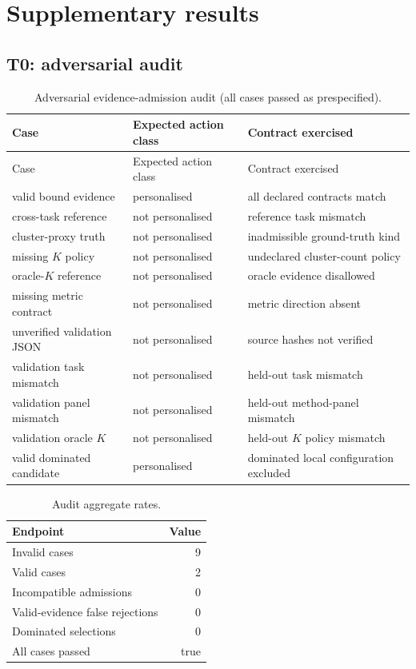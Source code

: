 \documentclass[11pt]{article}
\begin{document}
\section{Supplementary results}

\subsection{T0: adversarial audit}

\begin{longtable}{@{}p{}p{}p{}@{}}
\caption{Adversarial evidence-admission audit (all cases passed as
prespecified).
\label{tab:audit}}\\
\toprule
Case & Expected action class & Contract exercised \\
\midrule
\endfirsthead
\toprule
Case & Expected action class & Contract exercised \\
\midrule
\endhead
valid bound evidence & personalised & all declared contracts match \\
cross-task reference & not personalised & reference task mismatch \\
cluster-proxy truth & not personalised & inadmissible ground-truth kind \\
missing \(K\) policy & not personalised & undeclared cluster-count policy \\
oracle-\(K\) reference & not personalised & oracle evidence disallowed \\
missing metric contract & not personalised & metric direction absent \\
unverified validation JSON & not personalised & source hashes not verified \\
validation task mismatch & not personalised & held-out task mismatch \\
validation panel mismatch & not personalised & held-out method-panel mismatch \\
validation oracle \(K\) & not personalised & held-out \(K\) policy mismatch \\
valid dominated candidate & personalised & dominated local configuration excluded \\
\bottomrule
\end{longtable}

\begin{table}[ht]
\centering
\caption{Audit aggregate rates.
\label{tab:audit-rates}}
\begin{tabular}{@{}lr@{}}
\toprule
Endpoint & Value \\
\midrule
Invalid cases & 9 \\
Valid cases & 2 \\
Incompatible admissions & 0 \\
Valid-evidence false rejections & 0 \\
Dominated selections & 0 \\
All cases passed & true \\
\bottomrule
\end{tabular}
\end{table}
\end{document}
